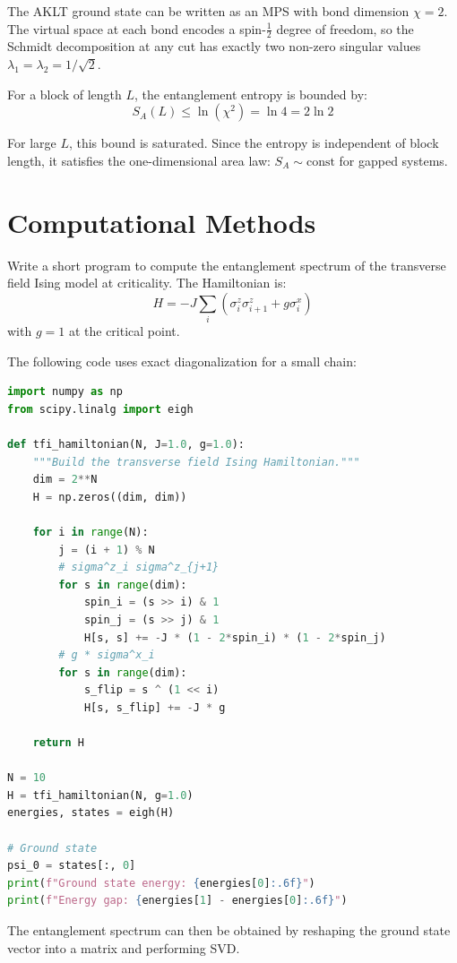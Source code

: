 \documentclass[assignment]{academic-report}
\begin{document}
\begin{solution}
The AKLT ground state can be written as an MPS with bond dimension $\chi = 2$.
The virtual space at each bond encodes a spin-$\frac{1}{2}$ degree of freedom,
so the Schmidt decomposition at any cut has exactly two non-zero singular
values $\lambda_1 = \lambda_2 = 1/\sqrt{2}$.

For a block of length $L$, the entanglement entropy is bounded by:
\begin{equation}
  S_A(L) \leq \ln(\chi^2) = \ln 4 = 2\ln 2
\end{equation}

For large $L$, this bound is saturated. Since the entropy is independent of
block length, it satisfies the one-dimensional area law: $S_A \sim \text{const}$
for gapped systems.
\end{solution}

\section{Computational Methods}

\begin{problem}
Write a short program to compute the entanglement spectrum of the transverse
field Ising model at criticality. The Hamiltonian is:
\begin{equation}
  H = -J\sum_i \left(\sigma_i^z \sigma_{i+1}^z + g\sigma_i^x\right)
\end{equation}
with $g = 1$ at the critical point.
\end{problem}

\begin{solution}
The following code uses exact diagonalization for a small chain:

\begin{lstlisting}[language=Python, caption={Exact diagonalization of TFI model}]
import numpy as np
from scipy.linalg import eigh

def tfi_hamiltonian(N, J=1.0, g=1.0):
    """Build the transverse field Ising Hamiltonian."""
    dim = 2**N
    H = np.zeros((dim, dim))

    for i in range(N):
        j = (i + 1) % N
        # sigma^z_i sigma^z_{j+1}
        for s in range(dim):
            spin_i = (s >> i) & 1
            spin_j = (s >> j) & 1
            H[s, s] += -J * (1 - 2*spin_i) * (1 - 2*spin_j)
        # g * sigma^x_i
        for s in range(dim):
            s_flip = s ^ (1 << i)
            H[s, s_flip] += -J * g

    return H

N = 10
H = tfi_hamiltonian(N, g=1.0)
energies, states = eigh(H)

# Ground state
psi_0 = states[:, 0]
print(f"Ground state energy: {energies[0]:.6f}")
print(f"Energy gap: {energies[1] - energies[0]:.6f}")
\end{lstlisting}

The entanglement spectrum can then be obtained by reshaping the ground state
vector into a matrix and performing SVD.
\end{solution}
\end{document}
